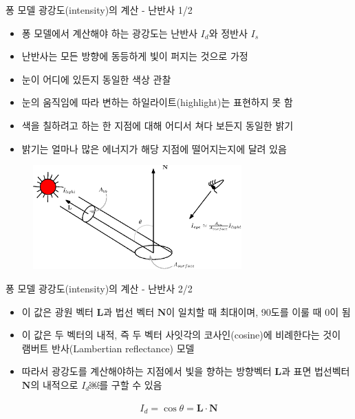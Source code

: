 \begin{frame}[fragile]{퐁 모델 광강도(intensity)의 계산 - 난반사 1/2}

\begin{itemize}
\item 퐁 모델에서 계산해야 하는 광강도는 난반사 $I_d$와 정반사 $I_s$
\item 난반사는 모든 방향에 동등하게 빛이 퍼지는 것으로 가정
\item 눈이 어디에 있든지 동일한 색상 관찰
\item 눈의 움직임에 따라 변하는 하일라이트(highlight)는 표현하지 못 함
\item 색을 칠하려고 하는 한 지점에 대해 어디서 쳐다 보든지 동일한 밝기
\item 밝기는 얼마나 많은 에너지가 해당 지점에 떨어지는지에 달려 있음
\end{itemize}

\begin{figure}[h!]
  \centering
    \includegraphics[height=4cm]{Math_lighting/diffuseConcept.eps}
\end{figure}


\end{frame}

\begin{frame}[fragile]{퐁 모델 광강도(intensity)의 계산 - 난반사 2/2}

\begin{itemize}
\item 이 값은 광원 벡터 $\mathbf L$과 법선 벡터 $\mathbf N$이 일치할 때 최대이며, 90도를 이룰 때 0이 됨
\item 이 값은 두 벡터의 내적, 즉 두 벡터 사잇각의 코사인(cosine)에 비례한다는 것이 램버트 반사(Lambertian reflectance) 모델
\item 따라서 광강도를 계산해야하는 지점에서 빛을 향하는 방향벡터 $\mathbf L$과 표면 법선벡터 $\mathbf N$의 내적으로  $I_d$￼를 구할 수 있음
\end{itemize}

\begin{eqnarray}
\label{eq:diffuseIntensity}
I_d  =  \cos \theta   = \mathbf L \cdot \mathbf N
\end{eqnarray}

\end{frame}


